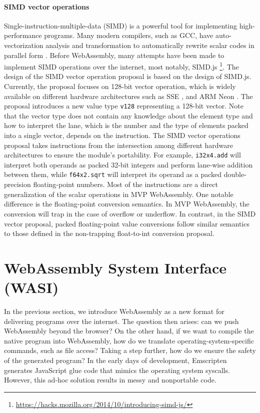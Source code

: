 \paragraph{SIMD vector operations}
Single-instruction-multiple-data (SIMD) is a powerful tool for implementing
high-performance programs. Many modern compilers, such as GCC, have
auto-vectorization analysis and transformation to automatically rewrite scalar
codes in parallel form \cite{auto-vec-gcc}. Before WebAssembly, many attempts
have been made to implement SIMD operations over the internet, most notably,
SIMD.js \footnote{\url{https://hacks.mozilla.org/2014/10/introducing-simd-js/}}.
The design of the SIMD vector operation proposal is based on the design of
SIMD.js. Currently, the proposal focuses on 128-bit vector operation, which is
widely available on different hardware architectures such as SSE
\cite{sse-intel}, and ARM Neon \cite{arm-neon}. The proposal introduces a new
value type \texttt{v128} representing a 128-bit vector. Note that the vector
type does not contain any knowledge about the element type and how to interpret
the lane, which is the number and the type of elements packed into a single
vector, depends on the instruction. The SIMD vector operations proposal takes
instructions from the intersection among different hardware architectures to
ensure the module's portability. For example, \texttt{i32x4.add} will interpret
both operands as packed 32-bit integers and perform lane-wise addition between
them, while \texttt{f64x2.sqrt} will interpret its operand as a packed
double-precision floating-point numbers. Most of the instructions are a direct
generalization of the scalar operations in MVP WebAssembly. One notable
difference is the floating-point conversion semantics. In MVP WebAssembly, the
conversion will trap in the case of overflow or underflow. In contrast, in the
SIMD vector proposal, packed floating-point value conversions follow similar
semantics to those defined in the non-trapping float-to-int conversion proposal.

\section{WebAssembly System Interface (WASI)}

In the previous section, we introduce WebAssembly as a new format for delivering
programs over the internet. The question then arises: can we push WebAssembly
beyond the browser? On the other hand, if we want to compile the native program
into WebAssembly, how do we translate operating-system-specific commands, such
as file access? Taking a step further, how do we ensure the safety of the
generated program? In the early days of development, Emscripten generates
JavaScript glue code that mimics the operating system syscalls. However, this
ad-hoc solution results in messy and nonportable code.


